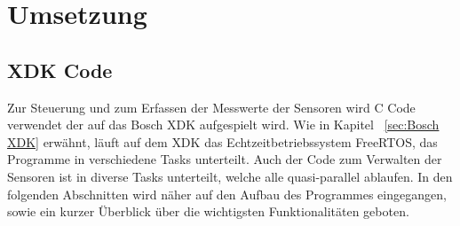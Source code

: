 
\chapter{Umsetzung}\label{cha:Umsetzung}
\section{XDK Code}\label{sec:XDK Code}
Zur Steuerung und zum Erfassen der Messwerte der Sensoren wird C Code verwendet der auf das Bosch \acs{XDK} aufgespielt wird. Wie in Kapitel ~\ref{sec:Bosch XDK} erwähnt, läuft auf dem \acs{XDK} das Echtzeitbetriebssystem FreeRTOS, das Programme in verschiedene Tasks unterteilt. Auch der Code zum Verwalten der Sensoren ist in diverse Tasks unterteilt, welche alle quasi-parallel ablaufen.
\newline
In den folgenden Abschnitten wird näher auf den Aufbau des Programmes eingegangen, sowie ein kurzer Überblick über die wichtigsten Funktionalitäten geboten.
